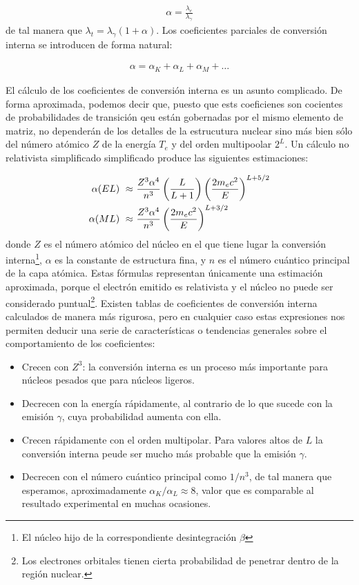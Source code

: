 \begin{eqnarray}
	\alpha = \frac{\lambda_e}{\lambda_\gamma}
\end{eqnarray}
de tal manera que $\lambda_t = \lambda_\gamma (1+\alpha)$. Los coeficientes parciales de conversión interna se introducen de forma natural:

\begin{eqnarray}
	\alpha= \alpha_K + \alpha_L + \alpha_M + \ldots
\end{eqnarray}

El cálculo de los coeficientes de conversión interna es un asunto complicado. De forma aproximada, podemos decir que, puesto que ests coeficienes son cocientes de probabilidades de transición qeu están gobernadas por el mismo elemento de matriz, no dependerán de los detalles de la estrucutura nuclear sino más bien sólo del número atómico $Z$ de la energía $T_e$ y del orden multipoolar $ 2^L$. Un cálculo no relativista simplificado simplificado produce las siguientes estimaciones:

\begin{equation}
	\begin{split}
		\alpha (EL) \ \approx \ & \frac{Z^3\alpha^4}{n^3} \left( \frac{L}{L+1} \right) \left( \frac{2m_ec^2}{E} \right)^{L+5/2} \\
		\alpha (ML) \ \approx \ & \frac{Z^3\alpha^4}{n^3}  \left( \frac{2m_ec^2}{E} \right)^{L+3/2} \\
	\end{split}	
\end{equation}
donde $Z$ es el número atómico del núcleo en el que tiene lugar la conversión interna\footnote{El núcleo hijo de la correspondiente desintegración $\beta$}, $\alpha$ es la constante de estructura fina, y $n$ es el número cuántico principal de la capa atómica. Estas fórmulas representan únicamente una estimación aproximada, porque el electrón emitido es relativista y el núcleo no puede ser considerado puntual\footnote{Los electrones orbitales tienen cierta probabilidad de penetrar dentro de la región nuclear.}. Existen tablas de coeficientes de conversión interna calculados de manera más rigurosa, pero en cualquier caso estas expresiones nos permiten deducir una serie de características o tendencias generales sobre el comportamiento de los coeficientes: 

\begin{itemize}
	\item Crecen con $Z^3$: la conversión interna es un proceso más importante para núcleos pesados que para núcleos ligeros.
	\item Decrecen con la energía rápidamente, al contrario de lo que sucede con la emisión $\gamma$, cuya probabilidad aumenta con ella.
	\item Crecen rápidamente con el orden multipolar. Para valores altos de $L$ la conversión interna peude ser mucho más probable que la emisión $\gamma$. 
	\item Decrecen con el número cuántico principal como $1/n^3$, de tal manera que esperamos, aproximadamente $\alpha_K/\alpha_L\approx 8$, valor que es comparable al resultado experimental en muchas ocasiones.
\end{itemize}

